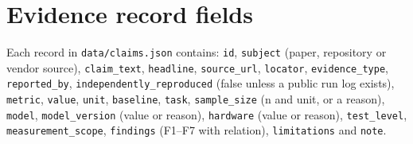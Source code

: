 \section{Evidence record fields}\label{sec:appendix-b-evidence-record-fields}

Each record in \texttt{data/claims.json} contains: \texttt{id}, \texttt{subject} (paper, repository or vendor source), \texttt{claim\_text}, \texttt{headline}, \texttt{source\_url}, \texttt{locator}, \texttt{evidence\_type}, \texttt{reported\_by}, \texttt{independently\_reproduced} (false unless a public run log exists), \texttt{metric}, \texttt{value}, \texttt{unit}, \texttt{baseline}, \texttt{task}, \texttt{sample\_size} (n and unit, or a reason), \texttt{model}, \texttt{model\_version} (value or reason), \texttt{hardware} (value or reason), \texttt{test\_level}, \texttt{measurement\_scope}, \texttt{findings} (F1–F7 with relation), \texttt{limitations} and \texttt{note}.
